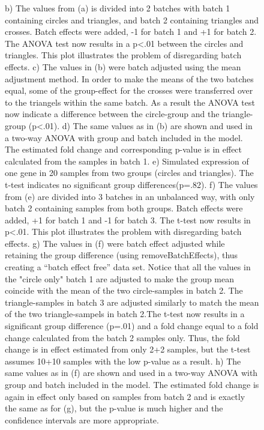 \documentclass{bio}
\begin{document}
\begin{figure}[!p]
{b) The values from (a) is divided into 2 batches with batch 1 containing circles and triangles, and batch 2 containing triangles and crosses. Batch effects were added, -1 for batch 1 and +1 for batch 2. The ANOVA test now results in a p<.01 between the circles and triangles. This plot illustrates the problem of disregarding batch effects.
c) The values in (b) were batch adjusted using the mean adjustment method. In order to make the means of the two batches equal, some of the group-effect for the crosses were transferred over to the triangels within the same batch. As a result the ANOVA test now indicate a difference between the circle-group and the triangle-group (p<.01).
d) The same values as in (b) are shown and used in a two-way ANOVA with group and batch included in the model. The estimated fold change and corresponding p-value is in effect calculated from the samples in batch 1.
e) Simulated expression of one gene in 20 samples from two groups (circles and triangles). The t-test indicates no significant group differences(p=.82).
f) The values from (e) are divided into 3 batches in an unbalanced way, with only batch 2 containing samples from both groups. Batch effects were added, +1 for batch 1 and -1 for batch 3. The t-test now results in p<.01. This plot illustrates the problem with disregarding batch effects.
g) The values in (f) were batch effect adjusted while retaining the group difference (using removeBatchEffects), thus creating a ``batch effect free'' data set. Notice that all the values in the "circle only" batch 1 are adjusted to make the group mean coincide with the mean of the two circle-samples in batch 2. The triangle-samples in batch 3 are adjusted similarly to match the mean of the two triangle-sampels in batch 2.The t-test now results in a significant group difference (p=.01) and a fold change equal to a fold change calculated from the batch 2 samples only. Thus, the fold change is in effect estimated from only 2+2 samples, but the t-test assumes 10+10 samples with the low p-value as a result.
h) The same values as in (f) are shown and used in a two-way ANOVA with group and batch included in the model. The estimated fold change is again in effect only based on samples from batch 2 and is exactly the same as for (g), but the p-value is much higher and the confidence intervals are more appropriate.
}
\label{fig:boxplots_v3}
\end{figure}
\end{document}
